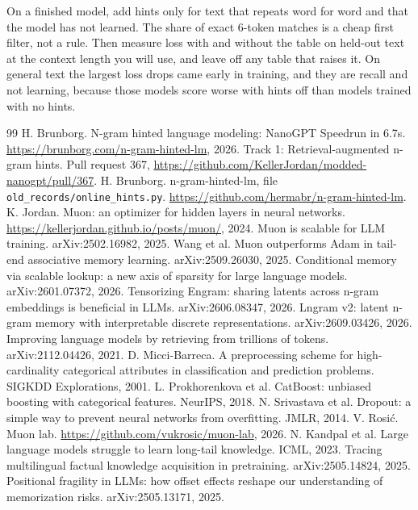 \documentclass[11pt]{article}
\begin{document}
On a finished model, add hints only for text that repeats word for word and that the model has not learned. The share of exact 6-token matches is a cheap first filter, not a rule. Then measure loss with and without the table on held-out text at the context length you will use, and leave off any table that raises it. On general text the largest loss drops came early in training, and they are recall and not learning, because those models score worse with hints off than models trained with no hints.

\begin{thebibliography}{99}\small
{} H. Brunborg. N-gram hinted language modeling: NanoGPT Speedrun in 6.7s. \url{https://brunborg.com/n-gram-hinted-lm}, 2026.
 Track 1: Retrieval-augmented n-gram hints. Pull request 367, \url{https://github.com/KellerJordan/modded-nanogpt/pull/367}.
 H. Brunborg. n-gram-hinted-lm, file \texttt{old\_records/online\_hints.py}. \url{https://github.com/hermabr/n-gram-hinted-lm}.
 K. Jordan. Muon: an optimizer for hidden layers in neural networks. \url{https://kellerjordan.github.io/posts/muon/}, 2024.
 Muon is scalable for LLM training. arXiv:2502.16982, 2025.
 Wang et al. Muon outperforms Adam in tail-end associative memory learning. arXiv:2509.26030, 2025.
 Conditional memory via scalable lookup: a new axis of sparsity for large language models. arXiv:2601.07372, 2026.
 Tensorizing Engram: sharing latents across n-gram embeddings is beneficial in LLMs. arXiv:2606.08347, 2026.
 Lngram v2: latent n-gram memory with interpretable discrete representations. arXiv:2609.03426, 2026.
 Improving language models by retrieving from trillions of tokens. arXiv:2112.04426, 2021.
 D. Micci-Barreca. A preprocessing scheme for high-cardinality categorical attributes in classification and prediction problems. SIGKDD Explorations, 2001.
 L. Prokhorenkova et al. CatBoost: unbiased boosting with categorical features. NeurIPS, 2018.
 N. Srivastava et al. Dropout: a simple way to prevent neural networks from overfitting. JMLR, 2014.
 V. Rosi\'c. Muon lab. \url{https://github.com/vukrosic/muon-lab}, 2026.
 N. Kandpal et al. Large language models struggle to learn long-tail knowledge. ICML, 2023.
 Tracing multilingual factual knowledge acquisition in pretraining. arXiv:2505.14824, 2025.
 Positional fragility in LLMs: how offset effects reshape our understanding of memorization risks. arXiv:2505.13171, 2025.

\end{thebibliography}
\end{document}
